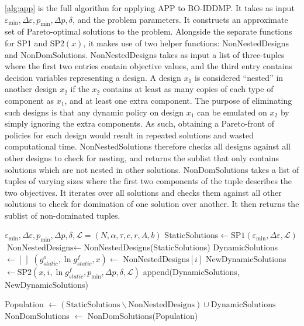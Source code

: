 \documentclass[11pt,authoryear,a4paper]{article}
\theoremstyle{definition}
\begin{document}
\autoref{alg:app} is the full algorithm for applying APP to BO-IDDMP. It takes as input $\varepsilon_{\min}, \Delta\varepsilon, p_{\min}, \Delta p, \delta$, and the problem parameters. It constructs an approximate set of Pareto-optimal solutions to the problem. Alongside the separate functions for SP1 and SP2$(x)$, it makes use of two helper functions: NonNestedDesigns and NonDomSolutions. NonNestedDesigns takes as input a list of three-tuples where the first two entries contain objective values, and the third entry contains decision variables representing a design. A design $x_1$ is considered ``nested'' in another design $x_2$ if the $x_2$ contains at least as many copies of each type of component as $x_1$, and at least one extra component. The purpose of eliminating such designs is that any dynamic policy on design $x_1$ can be emulated on $x_2$ by simply ignoring the extra components. As such, obtaining a Pareto-front of policies for each design would result in repeated solutions and wasted computational time. NonNestedSolutions therefore checks all designs against all other designs to check for nesting, and returns the sublist that only contains solutions which are not nested in other solutions. NonDomSolutions takes a list of tuples of varying sizes where the first two components of the tuple describes the two objectives. It iterates over all solutions and checks them against all other solutions to check for domination of one solution over another. It then returns the sublist of non-dominated tuples. 

\begin{algorithm}[h]
\caption{APP} \label{alg:app}
\begin{algorithmic}
\Require $\varepsilon_{\min}, \Delta\varepsilon, p_{\min}, \Delta p, \delta, \mathcal{L} =  (N, \alpha, \tau, c, r, A, b)$
\State StaticSolutions$\gets \text{SP1}(\varepsilon_{\min}, \Delta\varepsilon,\mathcal{L})$
\State $\text{NonNestedDesigns}\gets$NonNestedDesigns(StaticSolutions)
\State DynamicSolutions $\gets [\,]$
    \State $(g^o_{static}, \ln g^f_{static}, x) \gets$ NonNestedDesigns$[i]$
    \State NewDynamicSolutions$\gets \text{SP2}(x, i, \ln g^f_{static}, p_{\min}, \Delta p, \delta, \mathcal{L})$
    \State append(DynamicSolutions, NewDynamicSolutions)
\EndFor

\State Population $\gets (\text{StaticSolutions} \backslash \text{NonNestedDesigns}) \cup \text{DynamicSolutions}$
\State NonDomSolutions $\gets$ NonDomSolutions(Population)

\end{algorithmic}
\end{algorithm}
\end{document}
